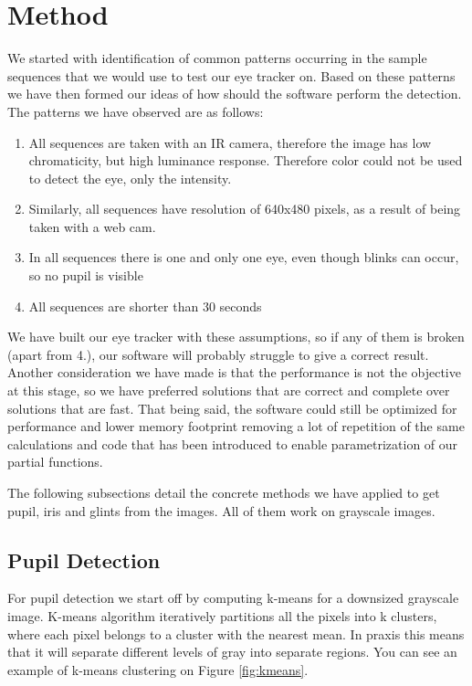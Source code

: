 \section{Method}

We started with identification of common patterns occurring in the sample sequences that we would use to test our eye tracker on. Based on these patterns we have then formed our ideas of how should the software perform the detection. The patterns we have observed are as follows:

\begin{enumerate}

\item All sequences are taken with an IR camera, therefore the image has low chromaticity, but high luminance response. Therefore color could not be used to detect the eye, only the intensity.
\item Similarly, all sequences have resolution of 640x480 pixels, as a result of being taken with a web cam.
\item In all sequences there is one and only one eye, even though blinks can occur, so no pupil is visible
\item All sequences are shorter than 30 seconds

\end{enumerate}

We have built our eye tracker with these assumptions, so if any of them is broken (apart from 4.), our software will probably struggle to give a correct result. Another consideration we have made is that the performance is not the objective at this stage, so we have preferred solutions that are correct and complete over solutions that are fast. That being said, the software could still be optimized for performance and lower memory footprint removing a lot of repetition of the same calculations and code that has been introduced to enable parametrization of our partial functions.

The following subsections detail the concrete methods we have applied to get pupil, iris and glints from the images. All of them work on grayscale images.

\subsection{Pupil Detection}
For pupil detection we start off by computing k-means for a downsized grayscale image. K-means algorithm iteratively partitions all the pixels into k clusters, where each pixel belongs to a cluster with the nearest mean. In praxis this means that it will separate different levels of gray into separate regions. You can see an example of k-means clustering on Figure \ref{fig:kmeans}.

